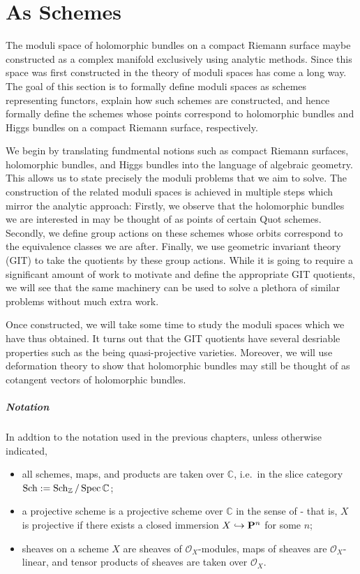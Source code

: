\documentclass[12pt]{ociamthesis}  %
\begin{document}
\missingsection

\chapter{As Schemes}

The moduli space of holomorphic bundles on a compact Riemann
surface maybe constructed as a complex manifold exclusively
using analytic methods. Since this space was first constructed
in \missingcitation
the theory of moduli spaces has come a long way.
The goal of this section is to formally define moduli spaces
as schemes representing functors, explain how such schemes
are constructed, and hence formally define the schemes whose
points correspond to holomorphic bundles and Higgs bundles
on a compact Riemann surface, respectively.

We begin by translating fundmental notions such as compact
Riemann surfaces, holomorphic bundles, and Higgs bundles into
the language of algebraic geometry. This allows us to state
precisely the moduli problems that we aim to solve. The construction
of the related moduli spaces is achieved in multiple steps which
mirror the analytic approach: Firstly, we observe that the
holomorphic bundles we are interested in may be thought of as
points of certain Quot schemes. Secondly, we define group
actions on these schemes whose orbits correspond to the
equivalence classes we are after. Finally, we use geometric
invariant theory (GIT) to take the quotients by these group
actions. While it is going to require a significant amount of
work to motivate and define the appropriate GIT quotients,
we will see that the same machinery can be used to solve
a plethora of similar problems without much extra work.

Once constructed, we will take some time to study the moduli
spaces which we have thus obtained. It turns out that the GIT
quotients have several desriable properties such as the being
quasi-projective varieties. Moreover, we will use deformation
theory to show that holomorphic bundles may still be thought
of as cotangent vectors of holomorphic bundles.

\paragraph*{Notation}

In addtion to the notation used in the previous chapters, unless
otherwise indicated,
\begin{itemize}
  \item all schemes, maps, and products are taken over $\mathbb{C}$,
        i.e.~in the slice category
        $\operatorname{Sch} := \operatorname{Sch}_{\mathbb{Z}}/\operatorname{Spec}\mathbb{C}$;
  \item a projective scheme is a projective scheme over $\mathbb{C}$
        in the sense of \cite{hartshorne1977} - that is, $X$ is projective
        if there exists a closed immersion $X\hookrightarrow\mathbf{P}^{n}_{}$ for
        some $n$;
  \item sheaves on a scheme $X$ are sheaves of $\mathscr O_X$-modules,
        maps of sheaves are $\mathscr O_X$-linear, and tensor products
        of sheaves are taken over $\mathscr O_X$.
\end{itemize}
\end{document}
